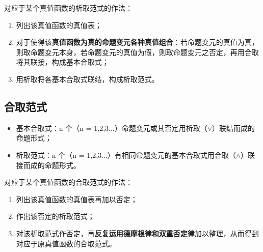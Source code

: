 \documentclass[12pt,onecolumn,a4paper]{book}
\numberwithin{table}{subsection}
\numberwithin{equation}{subsection}
\begin{document}
对应于某个真值函数的析取范式的作法：
\begin{enumerate}[itemsep=0pt,parsep=0pt]
    \item 列出该真值函数的真值表；
    \item 对于使得该\textbf{真值函数为真的命题变元各种真值组合}：若命题变元的真值为真，则取命题变元本身，若命题变元的真值为假，则取命题变元之否定，再用合取将其联接，构成基本合取式；
    \item 用析取将各基本合取式联结，构成析取范式。
\end{enumerate}

\subsection{合取范式}


\begin{itemize}[itemsep=0pt,parsep=0pt]
    \item 基本合取式：n 个（n = 1,2,3...）命题变元或其否定用析取（$\vee$）联结而成的命题形式；
    \item 析取范式：n 个（n  =  1,2,3...）有相同命题变元的基本合取式用合取（$\wedge$）联接而成的命题形式。
\end{itemize}

对应于某个真值函数的合取范式的作法：
\begin{enumerate}[itemsep=0pt,parsep=0pt]
    \item 列出该真值函数的真值表再加以否定；
    \item 作出该否定的析取范式；
    \item 对该析取范式作否定，再\textbf{反复运用德摩根律和双重否定律}加以整理，从而得到对应于原真值函数的合取范式。
\end{enumerate}
\end{document}
